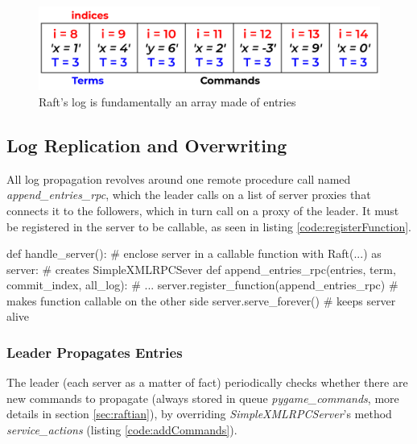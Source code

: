 \begin{figure}[h]
  \centering
  \includegraphics[width=.8\linewidth]{images/logStructure.png}
  
  \caption{Raft's log is fundamentally an array made of entries}
  \label{fig:logStructure}
\end{figure}

\subsection{Log Replication and Overwriting} \label{sec:logReplication}

All log propagation revolves around one remote procedure call named \textit{append\_entries\_rpc}, which the leader calls on a list of server proxies that connects it to the followers, which in turn call on a proxy of the leader. It must be registered in the server to be callable, as seen in listing \ref{code:registerFunction}.

\begin{python}[label={code:registerFunction}, caption={Register, thus making it callable, the remote procedure call \textit{append\_entries\_rpc}}]
def handle_server():                                    # enclose server in a callable function
    with Raft(...) as server:                           # creates SimpleXMLRPCSever
        def append_entries_rpc(entries, term, commit_index, all_log):
            # ...
        server.register_function(append_entries_rpc)    # makes function callable on the other side
        server.serve_forever()                          # keeps server alive 
\end{python}

\subsubsection{Leader Propagates Entries} \label{sec:leaderSends}

The leader (each server as a matter of fact) periodically checks whether there are new commands to propagate (always stored in queue \textit{pygame\_commands}, more details in section \ref{sec:raftian}), by overriding \textit{SimpleXMLRPCServer}'s method \textit{service\_actions} (listing \ref{code:addCommands}).

